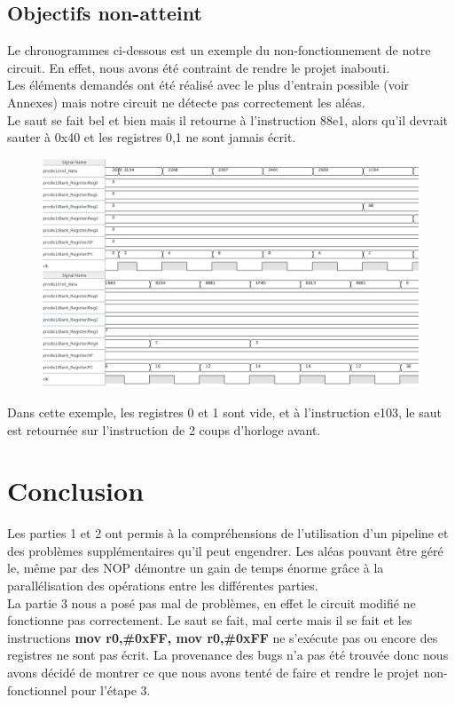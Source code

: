 \documentclass[a4paper]{article} %
\begin{document}
\subsection{Objectifs non-atteint}
Le chronogrammes ci-dessous est un exemple du non-fonctionnement de notre circuit. En effet, nous avons été contraint de rendre le projet inabouti.\\
Les éléments demandés ont été réalisé avec le plus d'entrain possible (voir Annexes) mais notre circuit ne détecte pas correctement les aléas.\\
Le saut se fait bel et bien mais il retourne à l'instruction 88e1, alors qu'il devrait sauter à 0x40 et les registres 0,1 ne sont jamais écrit.\\
\begin{figure}[H]
   \centering
   \includegraphics[width=.8\textwidth]{src/CHRONO_ET3.png}
\end{figure}
Dans cette exemple, les registres 0 et 1 sont vide, et à l'instruction e103, le saut est retournée sur l'instruction de 2 coups d'horloge avant.

\section{Conclusion}
Les parties 1 et 2 ont permis à la compréhensions de l'utilisation d'un pipeline et des problèmes supplémentaires qu'il peut engendrer. Les aléas pouvant être géré le, même par des NOP démontre un gain de temps énorme grâce à la parallélisation des opérations entre les différentes parties.\\
La partie 3 nous a posé pas mal de problèmes, en effet le circuit modifié ne fonctionne pas correctement. Le saut se fait, mal certe mais il se fait et les instructions \textbf{mov  r0,\#0xFF, mov r0,\#0xFF} ne s'exécute pas ou encore des registres ne sont pas écrit. La provenance des bugs n'a pas été trouvée donc nous avons décidé de montrer ce que nous avons tenté de faire et rendre le projet non-fonctionnel pour l'étape 3.
\end{document}
